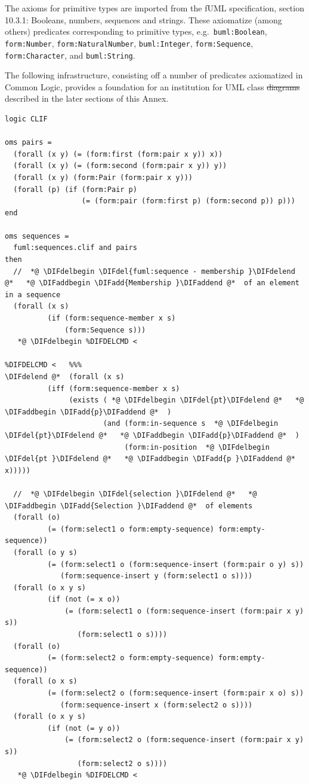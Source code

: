 \documentclass[10pt,fleqn,final]{scrreprt}
\newenvironment{definitions}[0]{\medskip }{}
\providecommand{\DIFadd}[1]{{\protect\color{blue}\uwave{#1}}} %
\providecommand{\DIFdel}[1]{{\protect\color{red}\sout{#1}}}                      %
\providecommand{\DIFaddbegin}{} %
\providecommand{\DIFaddend}{} %
\providecommand{\DIFdelbegin}{} %
\providecommand{\DIFdelend}{} %
\begin{document}
\begin{definitions}
 The axioms for primitive types
are imported from the fUML specification, section 10.3.1:
Booleans, numbers, sequences and strings.  These
axiomatize (among others) predicates corresponding to primitive types,
e.g.\ \texttt{buml:Boolean}, \texttt{form:Number},
\texttt{form:NaturalNumber}, \texttt{buml:Integer},
\texttt{form:Sequence}, \texttt{form:Character}, and
\texttt{buml:String}.

The following infrastructure, consisting off a number of predicates
axiomatized in Common Logic, provides a foundation for an institution
for UML class \DIFdelbegin \DIFdel{diagrams }\DIFdelend \DIFaddbegin \DIFadd{models }\DIFaddend described in the later sections of this Annex.

\begin{lstlisting}[language=clif,morekeywords={then,with,logic,oms,end},mathescape]
logic CLIF

oms pairs =
  (forall (x y) (= (form:first (form:pair x y)) x))
  (forall (x y) (= (form:second (form:pair x y)) y))
  (forall (x y) (form:Pair (form:pair x y)))
  (forall (p) (if (form:Pair p)
                  (= (form:pair (form:first p) (form:second p)) p)))
end

oms sequences =
  fuml:sequences.clif and pairs
then
  //  *@ \DIFdelbegin \DIFdel{fuml:sequence - membership }\DIFdelend @*   *@ \DIFaddbegin \DIFadd{Membership }\DIFaddend @*  of an element in a sequence
  (forall (x s)
          (if (form:sequence-member x s)
              (form:Sequence s)))
   *@ \DIFdelbegin %DIFDELCMD < 

%DIFDELCMD <   %%%
\DIFdelend @*  (forall (x s)
          (iff (form:sequence-member x s)
               (exists ( *@ \DIFdelbegin \DIFdel{pt}\DIFdelend @*   *@ \DIFaddbegin \DIFadd{p}\DIFaddend @*  ) 
                       (and (form:in-sequence s  *@ \DIFdelbegin \DIFdel{pt}\DIFdelend @*   *@ \DIFaddbegin \DIFadd{p}\DIFaddend @*  )
                            (form:in-position  *@ \DIFdelbegin \DIFdel{pt }\DIFdelend @*   *@ \DIFaddbegin \DIFadd{p }\DIFaddend @*  x)))))

  //  *@ \DIFdelbegin \DIFdel{selection }\DIFdelend @*   *@ \DIFaddbegin \DIFadd{Selection }\DIFaddend @*  of elements
  (forall (o)
          (= (form:select1 o form:empty-sequence) form:empty-sequence))
  (forall (o y s)
          (= (form:select1 o (form:sequence-insert (form:pair o y) s)) 
             (form:sequence-insert y (form:select1 o s))))
  (forall (o x y s)
          (if (not (= x o))
              (= (form:select1 o (form:sequence-insert (form:pair x y) s)) 
                 (form:select1 o s))))
  (forall (o)
          (= (form:select2 o form:empty-sequence) form:empty-sequence))
  (forall (o x s)
          (= (form:select2 o (form:sequence-insert (form:pair x o) s)) 
             (form:sequence-insert x (form:select2 o s))))
  (forall (o x y s)
          (if (not (= y o))
              (= (form:select2 o (form:sequence-insert (form:pair x y) s)) 
                 (form:select2 o s))))
   *@ \DIFdelbegin %DIFDELCMD < 


\end{lstlisting}
\end{definitions}
\end{document}
